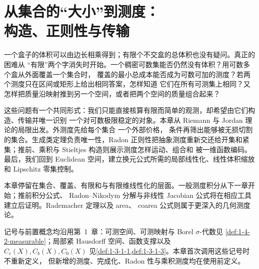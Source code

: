 \chapter[从集合的“大小”到测度：构造、正则性与传输]{从集合的“大小”到测度：\\构造、正则性与传输}\label{ch:02}

一个盒子的体积可以由边长相乘得到；有限个不交盒的总体积也没有疑问。真正的困难从
“有限”两个字消失时开始。一个稠密可数集能否仍然没有体积？用可数多个盒从外面覆盖一个集合时，
覆盖的最小总成本能否成为可数可加的测度？若两个测度只在区间或矩形上给出相同答案，怎样知道
它们在所有可测集上相同？又怎样把质量沿映射推到另一个空间，或者把两个空间的质量组合起来？

这些问题有一个共同形式：我们只能直接核算有限而简单的观测，却希望由它们构造、传输并唯一识别
一个对可数极限稳定的对象。本章从 Riemann 与 Jordan 理论的局限出发。外测度先给每个集合
一个外部价格，\Caratheodory{} 条件再筛出能够被无损切割的集合。生成类定理负责唯一性，Radon
正则性把抽象测度重新交还给开集和紧集；推前、乘积与 Stieltjes 构造则展示测度怎样运动、组合和
被一维函数编码。最后，我们回到 Euclidean 空间，建立换元公式所需的局部线性化、线性体积缩放和
Lipschitz 零集控制。

本章停留在集合、覆盖、有限和与有限维线性化的层面。一般测度积分从下一章开始；推前积分公式、
Radon--Nikodym 分解与非线性 Jacobian 公式将在相应工具建立后证明。Rademacher 定理以及 area、
coarea 公式则属于更深入的几何测度论。

记号与前置概念均沿用第~1~章：可测空间、可测映射与 Borel $\sigma$-代数见
\cref{def:1-4-2-measurable}；局部紧 Hausdorff 空间、函数支撑以及
$C_c(X),C_b(X),C_0(X)$ 见\cref{def:1-3-1-1,def:1-3-1-3}。本章首次调用这些记号时不重新定义，
但新增的测度、完成化、Radon 性与乘积测度均在使用前定义。





